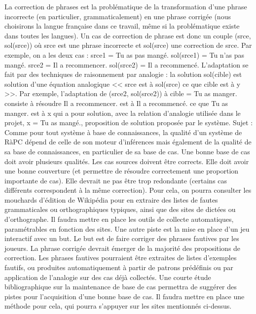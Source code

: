 \documentclass{article}
\begin{document}
La correction de phrases est la probl\'ematique de la transformation d'une phrase incorrecte (en particulier, grammaticalement) en une phrase corrig\'ee (nous choisirons la langue française dans ce travail, m\^eme si la probl\'ematique existe dans toutes les langues). Un cas de correction de phrase est donc un couple (srce, sol(srce)) o\`{u} srce est une phrase incorrecte et sol(srce) une correction de srce. Par exemple, on a les deux cas : 
srce1 = Tu as pas mang\'e. sol(srce1) = Tu n'as pas mang\'e. 
srce2 = Il a recommencer. sol(srce2) = Il a recommenc\'e. 
L'adaptation se fait par des techniques de raisonnement par analogie : la solution sol(cible) est solution d'une \'equation analogique << srce est \`{a} sol(srce) ce que cible est \`{a} y >>. Par exemple, l'adaptation de (srce2, sol(srce2)) \`{a} cible = Tu as manger. consiste \`{a} r\'esoudre Il a recommencer. est \`{a} Il a recommenc\'e. ce que Tu as manger. est \`{a} x qui a pour solution, avec la relation d'analogie utilis\'ee dans le projet, x = Tu as mang\'e., proposition de solution propos\'ee par le syst\`{e}me. 
Sujet : 
Comme pour tout syst\`{e}me \`{a} base de connaissances, la qualit\'e d'un syst\`{e}me de R\`{a}PC d\'epend de celle de son moteur d'inf\'erences mais \'egalement de la qualit\'e de sa base de connaissances, en particulier de sa base de cas. Une bonne base de cas doit avoir plusieurs qualit\'es. Les cas sources doivent \^etre corrects. Elle doit avoir une bonne couverture (et permettre de r\'esoudre correctement une proportion importante de cas). Elle devrait ne pas \^etre trop redondante (certains cas diff\'erents correspondent \`{a} la m\^eme correction). 
Pour cela, on pourra consulter les mouchards d'\'edition de Wikip\'edia pour en extraire des listes de fautes grammaticales ou orthographiques typiques, ainsi que des sites de dict\'ees ou d'orthographe. Il faudra mettre en place les outils de collecte automatiques, param\'etrables en fonction des sites. 
Une autre piste est la mise en place d'un jeu interactif avec un but. Le but est de faire corriger des phrases fautives par les joueurs. La phrase corrig\'ee devrait \'emerger de la majorit\'e des propositions de correction. Les phrases fautives pourraient \^etre extraites de listes d'exemples fautifs, ou produites automatiquement \`{a} partir de patrons pr\'ed\'efinis ou par application de l'analogie sur des cas d\'ej\`{a} collect\'es.
Une courte \'etude bibliographique sur la maintenance de base de cas permettra de sugg\'erer des pistes pour l'acquisition d'une bonne base de cas. Il faudra mettre en place une m\'ethode pour cela, qui pourra s'appuyer sur les sites mentionn\'es ci-dessus.
\end{document}
